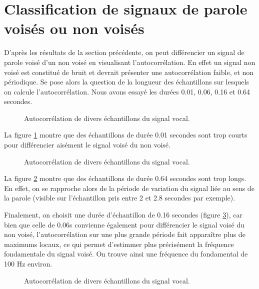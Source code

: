 \documentclass[french]{article}
\begin{document}
\FloatBarrier

\section{ Classification de signaux de parole voisés ou non voisés}

\label{sect:autocorr_voise}

D'après les résultats de la section précédente, on peut différencier un signal de parole voisé d'un non voisé en visualisant l'autocorrélation. En effet un signal non voisé est constitué de bruit et devrait présenter une autocorrélation faible, et non périodique. Se pose alors la question de la longueur des échantillons sur lesquels on calcule l'autocorrélation. Nous avons essayé les durées 0.01, 0.06, 0.16 et 0.64 secondes.

\begin{figure}[h!]
\centering

\caption{Autocorrélation de divers échantillons du signal vocal.}
\label{classif1}
\end{figure}

La figure \ref{classif1} montre que des échantillons de durée 0.01 secondes sont trop courts pour différencier aisément le signal voisé du non voisé.
\FloatBarrier
\begin{figure}[h!]
\centering

\caption{Autocorrélation de divers échantillons du signal vocal.}
\label{classif4}
\end{figure}

La figure \ref{classif4} montre que des échantillons de durée 0.64 secondes sont trop longs. En effet, on se rapproche alors de la période de variation du signal liée au sens de la parole (visible sur l'échantillon pris entre 2 et 2.8 secondes par exemple).

\FloatBarrier

Finalement,  on choisit une durée d'échantillon de 0.16 secondes (figure \ref{classif3}), car bien que celle de 0.06s convienne également pour différencier le signal voisé du non voisé, l'autocorrélation sur une plus grande période fait apparaître plus de maximums locaux, ce qui permet d'estimmer plus précisément la fréquence fondamentale du signal voisé. On trouve ainsi une fréquence du fondamental de 100 Hz environ.

\begin{figure}[h!]
	\centering
	
	\caption{Autocorrélation de divers échantillons du signal vocal.}
	\label{classif3}
\end{figure}
\end{document}
